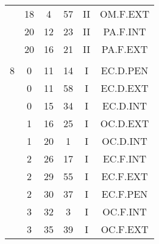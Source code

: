\documentclass[12pt, a4paper]{article}
\begin{document}
\begin{multicols}{3}
{\begin{tabular}{c c c c c c}
	 	 	 	 & 18 & 4 & 57 & II & OM.F.EXT\\%
	 	 	 	 & 20 & 12 & 23 & II & PA.F.INT\\%
	 	 	 	 & 20 & 16 & 21 & II & PA.F.EXT\\%
	 	 	 	 & & & & & \\%
	 	 	 	8 & 0 & 11 & 14 & I & EC.D.PEN\\%
	 	 	 	 & 0 & 11 & 58 & I & EC.D.EXT\\%
	 	 	 	 & 0 & 15 & 34 & I & EC.D.INT\\%
	 	 	 	 & 1 & 16 & 25 & I & OC.D.EXT\\%
	 	 	 	 & 1 & 20 & 1 & I & OC.D.INT\\%
	 	 	 	 & 2 & 26 & 17 & I & EC.F.INT\\%
	 	 	 	 & 2 & 29 & 55 & I & EC.F.EXT\\%
	 	 	 	 & 2 & 30 & 37 & I & EC.F.PEN\\%
	 	 	 	 & 3 & 32 & 3 & I & OC.F.INT\\%
	 	 	 	 & 3 & 35 & 39 & I & OC.F.EXT\\%
	 	 \end{tabular}
 	}
\end{multicols}
\end{document}
